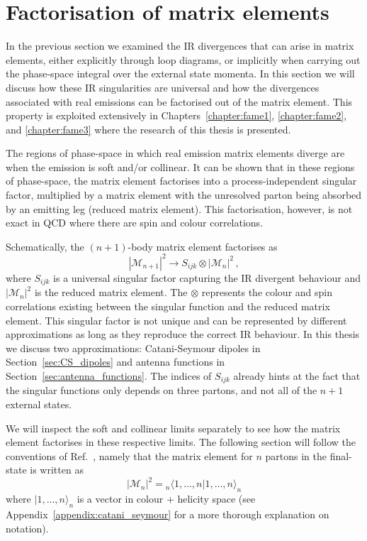 \documentclass[main.tex]{subfiles}
\begin{document}
\section{Factorisation of matrix elements}\label{sec:me_factorisation}
    In the previous section we examined the IR divergences
    that can arise in matrix elements, either explicitly
    through loop diagrams, or implicitly when carrying
    out the phase-space integral over the external state
    momenta. In this section we will discuss how these IR
    singularities are universal and how the divergences
    associated with real emissions can be factorised out
    of the matrix element. This property is exploited
    extensively in Chapters~\ref{chapter:fame1}, \ref{chapter:fame2},
    and \ref{chapter:fame3}
    where the research of this thesis is presented.

    The regions of phase-space in which real emission
    matrix elements diverge are when the emission is
    soft and/or collinear. It can be shown that in these
    regions of phase-space, the matrix element factorises
    into a process-independent singular factor, multiplied
    by a matrix element with the unresolved parton
    being absorbed by an emitting leg (reduced matrix
    element). This factorisation, however, is not exact
    in QCD where there are spin and colour correlations.

    Schematically, the $(n+1)$-body matrix element
    factorises as
    \begin{equation}\label{eqn:me_factorisation}
        |\mathcal{M}_{n+1}|^{2} \rightarrow S_{ijk} \otimes |\mathcal{M}_{n}|^{2} \, ,
    \end{equation}
    where $S_{ijk}$ is a universal singular factor capturing
    the IR divergent behaviour and $|\mathcal{M}_{n}|^{2}$
    is the reduced matrix element. The $\otimes$
    represents the colour and spin correlations existing
    between the singular function and the reduced matrix element.
    This singular factor
    is not unique and can be represented by different
    approximations as long as they reproduce the
    correct IR behaviour. In this thesis we discuss
    two approximations: Catani-Seymour dipoles \cite{Catani:1996vz}
    in Section~\ref{sec:CS_dipoles} and antenna functions \cite{Gehrmann-DeRidder:2005btv}
    in Section~\ref{sec:antenna_functions}. The indices
    of $S_{ijk}$ already hints at the fact that the singular
    functions only depends on three partons, and not all
    of the $n+1$ external states.

    We will inspect the soft and collinear limits separately
    to see how the matrix element factorises in these respective
    limits.
    The following section will follow the conventions
    of Ref.~\cite{Catani:1996vz}, namely that the matrix
    element for $n$ partons in the final-state is written as
    \begin{equation}\label{eqn:CS_matrix_element}
        |\mathcal{M}_{n}|^{2} = {}_{n}\langle 1, \ldots, n | 1, \ldots, n \rangle_{n}
    \end{equation}
    where $| 1, \ldots, n \rangle_{n}$ is a vector
    in colour + helicity space (see Appendix~\ref{appendix:catani_seymour}
    for a more thorough explanation on notation).
\end{document}
